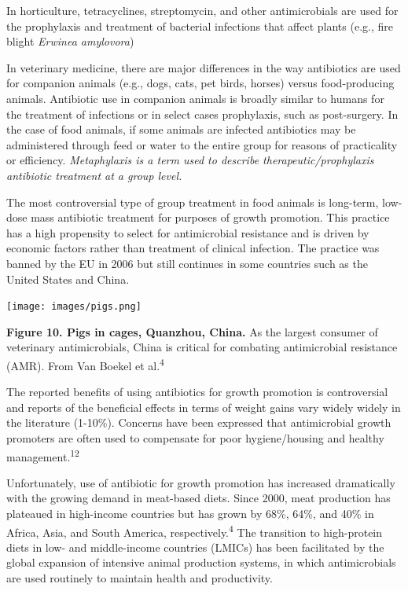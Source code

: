 \documentclass[
]{book}
\begin{document}
In horticulture, tetracyclines, streptomycin, and other antimicrobials are used for the prophylaxis and treatment of bacterial infections that affect plants (e.g., fire blight \emph{Erwinea amylovora})

In veterinary medicine, there are major differences in the way antibiotics are used for companion animals (e.g., dogs, cats, pet birds, horses) versus food-producing animals. Antibiotic use in companion animals is broadly similar to humans for the treatment of infections or in select cases prophylaxis, such as post-surgery. In the case of food animals, if some animals are infected antibiotics may be administered through feed or water to the entire group for reasons of practicality or efficiency. \emph{Metaphylaxis is a term used to describe therapeutic/prophylaxis antibiotic treatment at a group level.}

The most controversial type of group treatment in food animals is long-term, low-dose mass antibiotic treatment for purposes of growth promotion. This practice has a high propensity to select for antimicrobial resistance and is driven by economic factors rather than treatment of clinical infection. The practice was banned by the EU in 2006 but still continues in some countries such as the United States and China.

\texttt{[image: images/pigs.png]}

\textbf{Figure 10. Pigs in cages, Quanzhou, China.} As the largest consumer of veterinary antimicrobials, China is critical for combating antimicrobial resistance (AMR). From Van Boekel et al.\textsuperscript{4}

The reported benefits of using antibiotics for growth promotion is controversial and reports of the beneficial effects in terms of weight gains vary widely widely in the literature (1-10\%). Concerns have been expressed that antimicrobial growth promoters are often used to compensate for poor hygiene/housing and healthy management.\textsuperscript{12}

Unfortunately, use of antibiotic for growth promotion has increased dramatically with the growing demand in meat-based diets. Since 2000, meat production has plateaued in high-income countries but has grown by 68\%, 64\%, and 40\% in Africa, Asia, and South America, respectively.\textsuperscript{4} The transition to high-protein diets in low- and middle-income countries (LMICs) has been facilitated by the global expansion of intensive animal production systems, in which antimicrobials are used routinely to maintain health and productivity.
\end{document}
